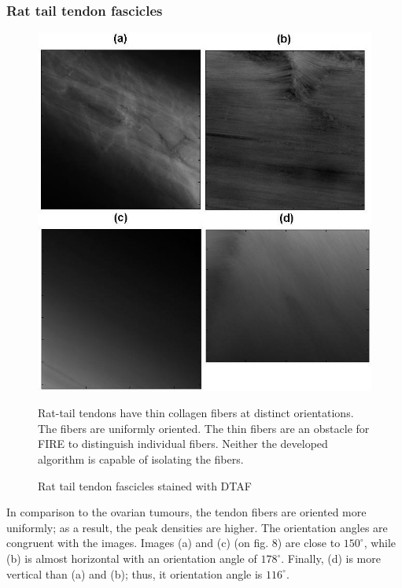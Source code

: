 \documentclass[12pt,a4paper]{article}
\begin{document}
\subsubsection{Rat tail tendon fascicles}
\begin{figure}
  \includegraphics[width=\linewidth]{FiguresDisertation/figure8.jpg}
  \caption{Rat tail tendon fascicles stained with DTAF}
  \medskip
  \small
  Rat-tail tendons have thin collagen fibers at distinct orientations. The fibers are uniformly oriented. The thin fibers are an obstacle for FIRE to distinguish individual fibers. Neither the developed algorithm is capable of isolating the fibers.
  
\end{figure}

In comparison to the ovarian tumours, the tendon fibers are oriented more uniformly; as a result, the peak densities are higher. The orientation angles are congruent with the images. Images (a) and (c) (on fig. 8) are close to $150^{\circ}$, while (b) is almost horizontal with an orientation angle of $178^{\circ}$. Finally, (d) is more vertical than (a) and (b); thus, it orientation angle is $116^{\circ}$.
\end{document}
